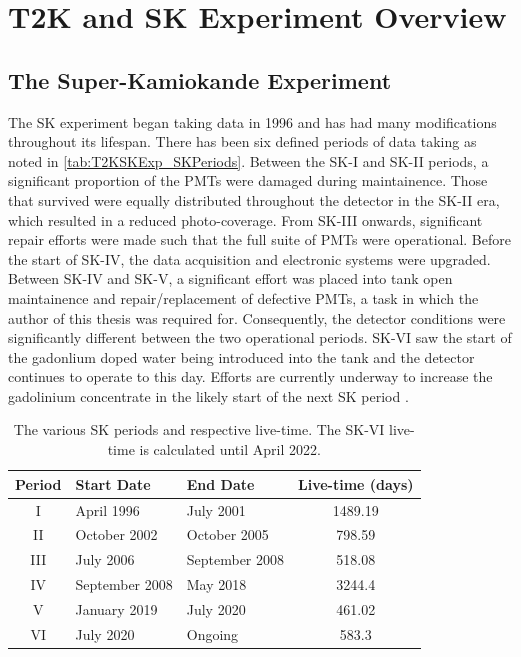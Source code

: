 \chapter{T2K and SK Experiment Overview}
\label{chap:T2KSKExp}


\section{The Super-Kamiokande Experiment}
\label{sec:T2KSKExp_SK}

The SK experiment began taking data in 1996 \cite{Fukuda1998-tw} and has had many modifications throughout its lifespan. There has been six defined periods of data taking as noted in \autoref{tab:T2KSKExp_SKPeriods}. Between the SK-I and SK-II periods, a significant proportion of the PMTs were damaged during maintainence. Those that survived were equally distributed throughout the detector in the SK-II era, which resulted in a reduced photo-coverage. From SK-III onwards, significant repair efforts were made such that the full suite of PMTs were operational. Before the start of SK-IV, the data acquisition and electronic systems were upgraded. Between SK-IV and SK-V, a significant effort was placed into tank open maintainence and repair/replacement of defective PMTs, a task in which the author of this thesis was required for. Consequently, the detector conditions were significantly different between the two operational periods. SK-VI saw the start of the  gadonlium doped water being introduced into the tank and the detector continues to operate to this day. Efforts are currently underway to increase the gadolinium concentrate in the likely start of the next SK period .

\begin{table}[ht!]
    \centering
    \begin{tabular}{c|l|l|c}
      \hline
      Period & Start Date & End Date & Live-time (days) \\
      \hline
      I & April 1996 & July 2001 & 1489.19 \\
      II & October 2002 & October 2005 & 798.59 \\
      III & July 2006 & September 2008 & 518.08 \\
      IV & September 2008 & May 2018 & 3244.4 \\
      V & January 2019 & July 2020 & 461.02 \\
      VI & July 2020 & Ongoing & 583.3 \\
      \hline 
      \hline
    \end{tabular}
    \caption{The various SK periods and respective live-time. The SK-VI live-time is calculated until  April 2022.}
    \label{tab:T2KSKExp_SKPeriods}
\end{table}

